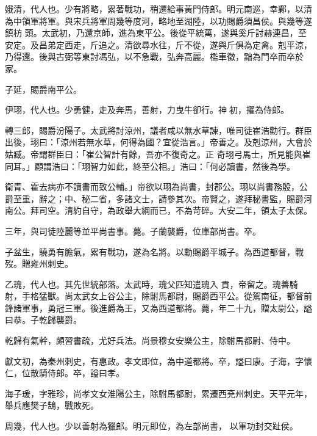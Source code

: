 \begin{pinyinscope}
 娥清，代人也。少有將略，累著戰功，稍遷給事黃門侍郎。明元南巡，幸鄴，以清為中領軍將軍。與宋兵將軍周幾等度河，略地至湖陸，以功賜爵須昌侯。與幾等遂鎮枋
 頭。太武初，乃還京師，進為東平公。後從平統萬，遂與奚斤討赫連昌，至安定。及昌弟定西走，斤追之。清欲尋水往，斤不從，遂與斤俱為定禽。剋平涼，乃得還。後與古弼等東討馮弘，以不急戰，弘奔高麗。檻車徵，黜為門卒而卒於家。



 子延，賜爵南平公。



 伊珝，代人也。少勇健，走及奔馬，善射，力曳牛卻行。神初，擢為侍郎。



 轉三郎，賜爵汾陽子。太武將討涼州，議者咸以無水草諫，唯司徒崔浩勸行。群臣出後，珝曰：「涼州若無水草，何得為國？宜從浩言。」帝善之。及剋涼州，大會於姑臧。帝謂群臣曰：「崔公智計有餘，吾亦不復奇之。正
 奇珝弓馬士，所見能與崔同耳。」顧謂浩曰：「珝智力如此，終至公相。」浩曰：「何必讀書，然後為學。



 衛青、霍去病亦不讀書而致公輔。」帝欲以珝為尚書，封郡公。珝以尚書務殷，公爵至重，辭之；中、秘二省，多諸文士，請參其次。帝賢之，遂拜秘書監，賜爵河南公。拜司空。清約自守，為政舉大綱而已，不為苛碎。大安二年，領太子太保。



 三年，與司徒陸麗等並平尚書事。薨。子蘭襲爵，位庫部尚書。卒。



 子盆生，驍勇有膽氣，累有戰功，遂為名將。以勳賜爵平城子。為西道都督，戰歿。贈雍州刺史。



 乙瑰，代人也。其先世統部落。太武時，瑰父匹知遣瑰入
 貢，帝留之。瑰善騎射，手格猛獸。尚太武女上谷公主，除駙馬都尉，賜爵西平公。從駕南征，都督前鋒諸軍事，勇冠三軍。後進爵為王，又為西道都將。薨，年二十九，贈太尉公，謚曰恭。子乾歸襲爵。



 乾歸有氣幹，頗習書疏，尤好兵法。尚景穆女安樂公主，除駙馬都尉、侍中。



 獻文初，為秦州刺史，有惠政。孝文即位，為中道都將。卒，謚曰康。子海，字懷仁，位散騎侍郎。卒，謚曰孝。



 海子瑗，字雅珍，尚孝文女淮陽公主，除駙馬都尉，累遷西兗州刺史。天平元年，舉兵應樊子鵠，戰敗死。



 周幾，代人也。少以善射為獵郎。明元即位，為左部尚書，
 以軍功封交趾侯。




\end{pinyinscope}
